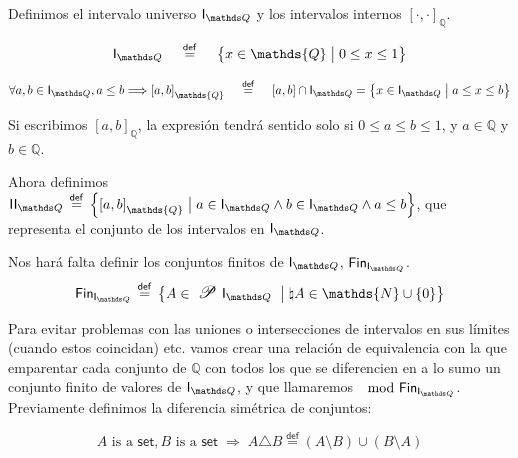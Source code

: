 \documentclass[final,12pt,a4paper,twoside,fleqn]{extbook}
\newcommand{\sthen}{\ensuremath{\Longrightarrow}}
\newcommand{\mathdef}{\ensuremath{\stackrel{\mathsf{def}}{{}={}}}}
\newcommand{\then}{\ensuremath{\sthen}}
\newcommand{\set}[1]{\ensuremath{\left\lbrace{#1}\right\rbrace}}
\newcommand {\setCompr}[2]{
	\ensuremath{
		\left\lbrace{ 
			#1 {\;\big{\vert}\;} #2
        }\right\rbrace
    }
}
\newcommand{\setN}{\ensuremath{\mathds{N}}}
\newcommand{\setQ}{\ensuremath{\mathds{Q}}}
\newcommand{\ly}{\ensuremath{         \wedge         }}
\theoremstyle{definition}
\theoremstyle{remark}
\begin{document}
\begin{enumerate} {
  \item {Definimos el intervalo universo \(\IQ\) y los intervalos internos
  \(\left[ \cdot , \cdot \right]_{\setQ}\).
  
  
  
  \begin{equation}
  \IQ \quad \mathdef \quad \setCompr{x \in \setQ}{0 \leq x \leq 1}
  \end{equation}
  
  
  
  \begin{equation}
  \forall a, b \in \IQ, a \leq b \then { \left[ {a,b} \right] }_{\setQ}
  \quad \mathdef \quad { \left[ {a,b} \right] } \cap \IQ = \setCompr{x \in
  \IQ} {a \le x \le b}
  \end{equation}
  }}
  
  
  
  \item { Si escribimos \( { \left[ { a , b } \right] }_{ \setQ } \), la
  expresión tendrá sentido solo si \( 0 \leq a \leq b \leq 1 \), y \(a \in
  \setQ \) y \( b \in \setQ \).}
  \item {Ahora definimos \( \IIQ \mathdef \setCompr{ { \left[ { a , b }
  \right] }_{ \setQ } } { a \in \IQ \ly b \in\IQ \ly a \leq b } \), que
  representa el conjunto de los intervalos en \(\IQ\).}
  
  
  
  \item {Nos hará falta definir los conjuntos finitos de \(\IQ\), \( \FinIQ
  \).
  \begin{equation}
  \FinIQ \mathdef \setCompr{A \in \powset{\IQ} } { \natural A \in \setN
  \cup \set{0} }
  \end{equation}
  }
  
  
  
  \item { Para evitar problemas con las uniones o intersecciones de
  intervalos en sus límites (cuando estos coincidan) etc. vamos crear una
  relación de equivalencia con la que emparentar cada conjunto de \(\setQ\)
  con todos los que se diferencien en a lo sumo un conjunto finito de
  valores de \(\IQ\), y que llamaremos \(\mod \FinIQ\). Previamente
  definimos la diferencia simétrica de conjuntos:
  
  
  
  \begin{equation}
  A \text{ is a } \mathsf{set}, B \text{ is a } \mathsf{set} \;\then\; A \triangle B \mathdef \left( A \setminus B \right) \cup \left( B \setminus A \right)
  \end{equation}
  
}
\end{enumerate}
\end{document}
